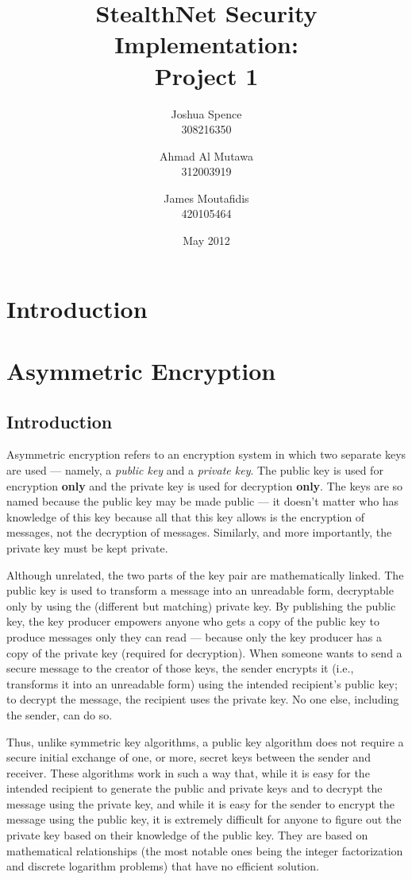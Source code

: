 \documentclass[a4paper,11pt]{article}
\title{StealthNet Security Implementation: \\ Project 1}
\author{Joshua Spence \\ 308216350 \and Ahmad Al Mutawa \\ 312003919 \and James Moutafidis \\ 420105464}
\date{May 2012}
\begin{document}
\maketitle

\section{Introduction}

\section{Asymmetric Encryption}

\subsection{Introduction}
Asymmetric encryption refers to an encryption system in which two separate keys 
are used --- namely, a \emph{public key} and a \emph{private key}. The public 
key is used for encryption \textbf{only} and the private key is used for
decryption \textbf{only}. The keys are so named because the public key may be 
made public --- it doesn't matter who has knowledge of this key because all that
this key allows is the encryption of messages, not the decryption of messages. 
Similarly, and more importantly, the private key must be kept private.

Although unrelated, the two parts of the key pair are mathematically linked. The
public key is used to transform a message into an unreadable form, decryptable 
only by using the (different but matching) private key. By publishing the public
key, the key producer empowers anyone who gets a copy of the public key to 
produce messages only they can read --- because only the key producer has a copy
of the private key (required for decryption). When someone wants to send a 
secure message to the creator of those keys, the sender encrypts it (i.e., 
transforms it into an unreadable form) using the intended recipient's public 
key; to decrypt the message, the recipient uses the private key. No one else, 
including the sender, can do so.

Thus, unlike symmetric key algorithms, a public key algorithm does not require a
secure initial exchange of one, or more, secret keys between the sender and 
receiver. These algorithms work in such a way that, while it is easy for the 
intended recipient to generate the public and private keys and to decrypt the 
message using the private key, and while it is easy for the sender to encrypt 
the message using the public key, it is extremely difficult for anyone to figure
out the private key based on their knowledge of the public key. They are based 
on mathematical relationships (the most notable ones being the integer 
factorization and discrete logarithm problems) that have no efficient solution.
\end{document}
